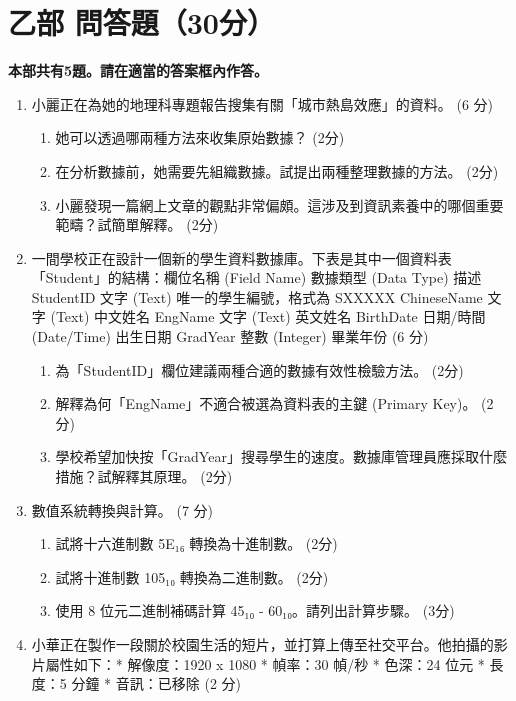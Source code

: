 \documentclass[12pt,a4paper]{article}
\begin{document}
\section{\textbf{乙部 問答題（30分）}}
\textbf{本部共有5題。請在適當的答案框內作答。}
\begin{enumerate}
\begin{enumerate}
\item 小麗正在為她的地理科專題報告搜集有關「城市熱島效應」的資料。 (6 分)
\begin{enumerate}[label=(\alph*)]
    \item 她可以透過哪兩種方法來收集原始數據？ (2分)
    \item 在分析數據前，她需要先組織數據。試提出兩種整理數據的方法。 (2分)
    \item 小麗發現一篇網上文章的觀點非常偏頗。這涉及到資訊素養中的哪個重要範疇？試簡單解釋。 (2分)
\end{enumerate}
\item 一間學校正在設計一個新的學生資料數據庫。下表是其中一個資料表「Student」的結構：欄位名稱 (Field Name) 數據類型 (Data Type) 描述 StudentID 文字 (Text) 唯一的學生編號，格式為 SXXXXX ChineseName 文字 (Text) 中文姓名 EngName 文字 (Text) 英文姓名 BirthDate 日期/時間 (Date/Time) 出生日期 GradYear 整數 (Integer) 畢業年份 (6 分)
\begin{enumerate}[label=(\alph*)]
    \item 為「StudentID」欄位建議兩種合適的數據有效性檢驗方法。 (2分)
    \item 解釋為何「EngName」不適合被選為資料表的主鍵 (Primary Key)。 (2分)
    \item 學校希望加快按「GradYear」搜尋學生的速度。數據庫管理員應採取什麼措施？試解釋其原理。 (2分)
\end{enumerate}
\item 數值系統轉換與計算。 (7 分)
\begin{enumerate}[label=(\alph*)]
    \item 試將十六進制數 5E₁₆ 轉換為十進制數。 (2分)
    \item 試將十進制數 105₁₀ 轉換為二進制數。 (2分)
    \item 使用 8 位元二進制補碼計算 45₁₀ - 60₁₀。請列出計算步驟。 (3分)
\end{enumerate}
\item 小華正在製作一段關於校園生活的短片，並打算上傳至社交平台。他拍攝的影片屬性如下：* 解像度：1920 x 1080 * 幀率：30 幀/秒 * 色深：24 位元 * 長度：5 分鐘 * 音訊：已移除 (2 分)
\begin{enumerate}[label=(\alph*)]

\end{enumerate}
\end{enumerate}
\end{enumerate}
\end{document}
